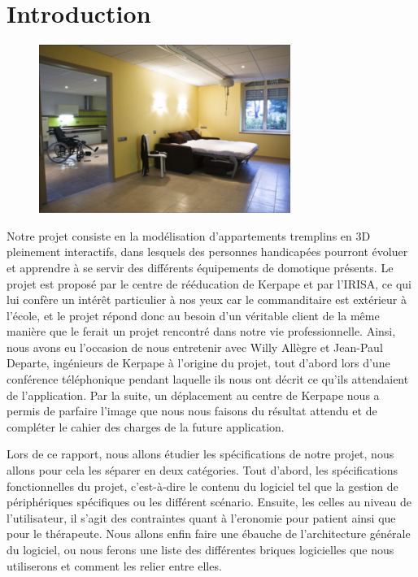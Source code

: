 \section{Introduction}

\begin{figure}
	\centering
	\includegraphics[scale=1]{1-PreEtude/img/appt_tremplin_intro.png}
\end{figure}

Notre projet consiste en la modélisation d'appartements tremplins en 3D pleinement interactifs, dans lesquels des personnes handicapées pourront évoluer et apprendre à se servir des différents équipements de domotique présents. 
Le projet est proposé par le centre de rééducation de Kerpape et par l'IRISA, ce qui lui confère un intérêt particulier à nos yeux car le commanditaire est extérieur à l'école, et le projet répond donc au besoin d'un véritable client de la même manière que le ferait un projet rencontré dans notre vie professionnelle. 
Ainsi, nous avons eu l'occasion de nous entretenir avec Willy Allègre et Jean-Paul Departe, ingénieurs de Kerpape à l'origine du projet, tout d'abord lors d'une conférence téléphonique pendant laquelle ils nous ont décrit ce qu'ils attendaient de l'application. Par la suite, un déplacement au centre de Kerpape nous a permis de parfaire l'image que nous nous faisons du résultat attendu et de compléter le cahier des charges de la future application. \newline

Lors de ce rapport, nous allons étudier les spécifications de notre projet, nous allons pour cela les séparer en deux catégories. Tout d'abord, les spécifications fonctionnelles du projet, c'est-à-dire le contenu du logiciel tel que la gestion de périphériques spécifiques ou les différent scénario. Ensuite, les celles au niveau de l'utilisateur, il s'agit des contraintes quant à l'eronomie pour patient ainsi que pour le thérapeute. Nous allons enfin faire une ébauche de l'architecture générale du logiciel, ou nous ferons une liste des différentes briques logicielles que nous utiliserons et comment les relier entre elles.


